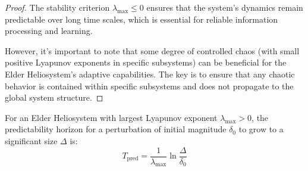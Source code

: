 \begin{proof}
The stability criterion $\lambda_{\max} \leq 0$ ensures that the system's dynamics remain predictable over long time scales, which is essential for reliable information processing and learning.

However, it's important to note that some degree of controlled chaos (with small positive Lyapunov exponents in specific subsystems) can be beneficial for the Elder Heliosystem's adaptive capabilities. The key is to ensure that any chaotic behavior is contained within specific subsystems and does not propagate to the global system structure.
\end{proof}

\begin{theorem}
For an Elder Heliosystem with largest Lyapunov exponent $\lambda_{\max} > 0$, the predictability horizon for a perturbation of initial magnitude $\delta_0$ to grow to a significant size $\Delta$ is:
\begin{equation}
T_{\text{pred}} = \frac{1}{\lambda_{\max}} \ln \frac{\Delta}{\delta_0}
\end{equation}
\end{theorem}

